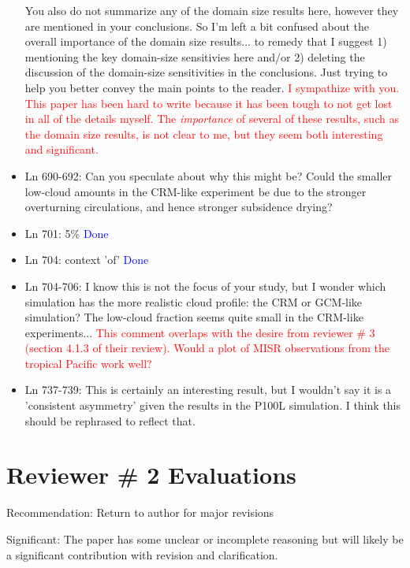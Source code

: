 \documentclass[draft]{agujournal2019}
\begin{document}
\begin{itemize}
You also do not summarize any of the domain size results here, however they are mentioned in your conclusions. So I'm left a bit confused about the overall importance of the domain size results... to remedy that I suggest 1) mentioning the key domain-size sensitivies here and/or 2)  deleting the discussion of the domain-size sensitivities in the conclusions. Just trying to help you better convey the main points to the reader.
  \textcolor{red}{I sympathize with you.  This paper has been hard to write because it has been tough to not get lost in all of the details myself.  The \textit{importance} of several of these results, such as the domain size results, is not clear to me, but they 
  seem both interesting and significant.}
  
  \item Ln 690-692: Can you speculate about why this might be? Could the smaller low-cloud amounts in the CRM-like experiment be due to the stronger overturning circulations, and hence stronger subsidence drying? 
  
  \item Ln 701: 5\%
  \textcolor{blue}{Done}
  
  \item Ln 704: context 'of' 
  \textcolor{blue}{Done}
  
  \item Ln 704-706: I know this is not the focus of your study, but I wonder which simulation has the more realistic cloud profile: the CRM or GCM-like simulation? The low-cloud fraction seems quite small in the CRM-like experiments...
  \textcolor{red}{This comment overlaps with the desire from reviewer \# 3 (section 4.1.3 of their review).  Would a plot of MISR observations from the tropical Pacific work well?  }
  
  \item Ln 737-739: This is certainly an interesting result, but I wouldn't say it is a 'consistent asymmetry' given the results in the P100L simulation. I think this should be rephrased to reflect that.
%
\end{itemize}

\section{Reviewer \# 2 Evaluations}

Recommendation: Return to author for major revisions

Significant: The paper has some unclear or incomplete reasoning but will likely be a significant contribution with revision and clarification.
\end{document}

